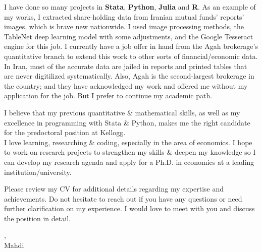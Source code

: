 \documentclass[12pt]{letter}
\begin{document}
\par

I have done so many projects in  \textbf{Stata}, \textbf{Python}, \textbf{Julia}
and \textbf{R}. As an example of my works, I extracted share-holding data from
Iranian mutual funds’ reports’ images, which is brave new nationwide.
I used image processing methods, the TableNet deep learning model with some
adjustments, and the Google Tesseract engine for this job.
I currently have a job offer in hand from the Agah brokerage's quantitative branch
to extend this work to other sorts of financial/economic data. In Iran, most of
the accurate data are jailed in reports and printed tables that are never
digitilized systematically. Also, Agah is the second-largest brokerage in the
country; and they have acknowledged my work and offered me without my application
for the job. But I prefer to continue my academic path.

\par

I believe that my previous quantitative \& mathematical skills,
as well as my excellence in programming with Stata \& Python,
makes me the right candidate for the predoctoral position at Kellogg.
\\
I love learning, researching \& coding, especially in the area of economics.
I hope to work on research projects to strengthen
my skills \& deepen my knowledge so I can develop my research agenda and apply
for a Ph.D. in economics at a leading institution/university.

Please review my CV for additional details regarding my expertise and
achievements. Do not hesitate to reach out if you have any questions or need further
clarification on my experience. I would love to meet with you and discuss the position in
detail.

\vspace{0.1in}
\vfill

\begin{flushleft}
    \closer,\\
    Mahdi
\end{flushleft}
\end{document}
